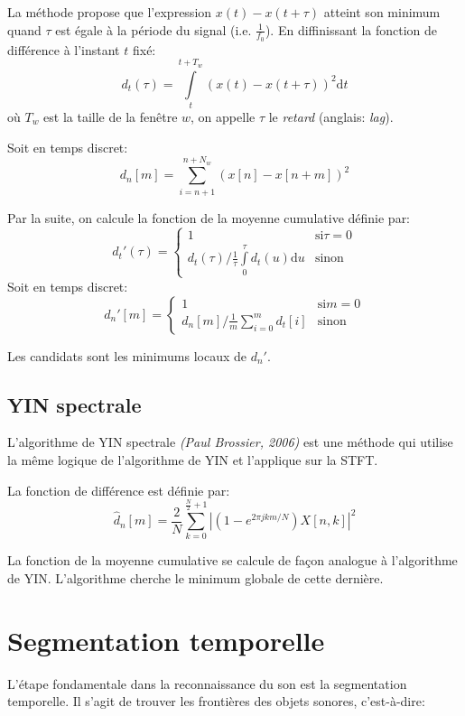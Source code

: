 \documentclass[]{article}
\begin{document}
La méthode propose que l'expression \(x(t)-x(t+\tau)\) atteint son
minimum quand \(\tau\) est égale à la période du signal (i.e.
\(\frac{1}{f_0}\)). En diffinissant la fonction de différence à
l'instant \(t\) fixé:
\[ d_t(\tau) = \int\limits_{t}^{t+T_w} \left(x(t)-x(t+\tau)\right)^2 \mathrm{d}t \]
où \(T_w\) est la taille de la fenêtre \(w\), on appelle \(\tau\) le
\emph{retard} (anglais: \emph{lag}).

Soit en temps discret:
\[ d_n[m] = \sum\limits_{i=n+1}^{n+N_w} \left(x[n]-x[n+m]\right)^2 \]

Par la suite, on calcule la fonction de la moyenne cumulative définie
par: \[d_t'(\tau) = \begin{cases}
1 &\text{si} \tau = 0\\
d_t(\tau) / \frac{1}{\tau}\int\limits_{0}^{\tau}d_t(u)\mathrm{d}u &\text{sinon}
\end{cases}\] Soit en temps discret: \[d_n'[m] = \begin{cases}
1 &\text{si} m = 0\\
d_n[m] / \frac{1}{m}\sum\limits_{i=0}^{m}d_t[i] &\text{sinon}
\end{cases}\]

Les candidats sont les minimums locaux de \(d_n'\).

\hypertarget{yin-spectrale}{%
\subsection{YIN spectrale}\label{yin-spectrale}}

L'algorithme de YIN spectrale \emph{(Paul Brossier, 2006)} est une
méthode qui utilise la même logique de l'algorithme de YIN et l'applique
sur la STFT.

La fonction de différence est définie par: \[ \hat{d}_n[m] = \frac{2}{N}
\sum\limits_{k=0}^{\frac{N}{2}+1}
\left\lvert\left( 1-e^{2\pi jkm/N} \right)   X[n,k]  \right\rvert^2 \]

La fonction de la moyenne cumulative se calcule de façon analogue à
l'algorithme de YIN. L'algorithme cherche le minimum globale de cette
dernière.

\hypertarget{segmentation-temporelle}{%
\section{Segmentation temporelle}\label{segmentation-temporelle}}

L'étape fondamentale dans la reconnaissance du son est la segmentation
temporelle. Il s'agit de trouver les frontières des objets sonores,
c'est-à-dire:
\end{document}
